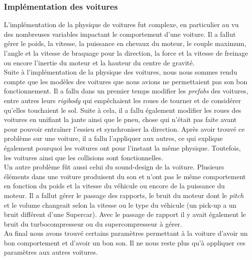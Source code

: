 \documentclass[12pt,a4paper]{article}
\begin{document}
            \subsubsection{Implémentation des voitures}
                L'implémentation de la physique de voitures fut complexe, en particulier au vu des 
                nombreuses variables impactant le comportement d'une voiture. Il a fallut gérer le 
                poids, la vitesse, la puissance en chevaux du moteur, le couple maximum, l'angle et la 
                vitesse de braquage pour la direction, la force et la vitesse de freinage ou encore 
                l'inertie du moteur et la hauteur du centre de gravité.\\
                Suite à l'implémentation de la physique des voitures, nous nous sommes rendu compte que 
                les modèles des voitures que nous avions ne permettaient pas son bon fonctionnement. Il 
                a fallu dans un premier temps modifier les \textsl{prefabs} des voitures, entre autres 
                leurs \textsl{rigibody} qui empêchaient les roues de tourner et de considérer qu'elles 
                touchaient le sol. Suite à cela, il a fallu également modifier les roues des voitures en
                unifiant la jante ainsi que le pneu, chose qui n'était pas faite avant pour pouvoir 
                entraîner l'essieu et synchroniser la direction. Après avoir trouvé ce problème sur une 
                voiture, il a fallu l'appliquer aux autres, ce qui explique également pourquoi les 
                voitures ont pour l'instant la même physique. Toutefois, les voitures ainsi que les 
                collisions sont fonctionnelles.\\
                Un autre problème fût aussi celui du sound-design de la voiture. Plusieurs éléments dans
                une voiture produisent du son et n'ont pas le même comportement en fonction du poids et
                la vitesse du véhicule ou encore de la puissance du moteur. Il a fallut gérer le passage
                des rapports, le bruit du moteur dont le \textsl{pitch} et le volume changeait selon la
                vitesse ou le type du véhicule (un pick-up a un bruit différent d'une Supercar). Avec le
                passage de rapport il y avait également le bruit du turbocompresseur ou du
                supercompresseur à gérer.\\
                Au final nous avons trouvé certains paramètres permettant à la voiture d'avoir un bon
                comportement et d'avoir un bon son. Il ne nous reste plus qu'à appliquer ces paramètres
                aux autres voitures.
\end{document}
